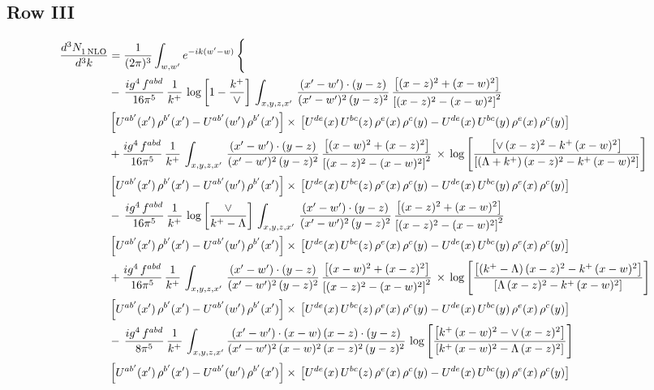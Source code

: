 \documentclass[9pt]{article}
\numberwithin{equation}{section}
\begin{document}
\subsection{Row III}
\begin{align}
   \frac{d^{3}N_{1\,\rm NLO}^{\rm}}{d^{3}k}  & = \frac{1}{(2\pi)^{3}}  \int_{w, w^\prime} e^{-ik(w^\prime-w)}\, \Bigg\{\notag \\ & -\,\frac{ig^{4}\,f^{abd}}{16\pi^{5}}\,\frac{1}{k^{+}}\, \log{\left[1-\frac{k^{+}}{\vee}\right]}\,\int_{x,y,z,x'}\, \frac{(x'-w')\cdot (y-z)}{(x'-w')^{2}\,(y-z)^{2}}\,\frac{\left[(x-z)^{2}+(x-w)^{2}\right]}{\left[(x-z)^{2}-(x-w)^{2}\right]^{2}}\notag \\ & \left[U^{ab'}(x')\,\rho^{b'}(x')-U^{ab'}(w')\, \rho^{b'}(x')\right]\times\, \left[U^{de}(x)\,U^{bc}(z)\, \rho^{e}(x)\,\rho^{c}(y)-U^{de}(x)\,U^{bc}(y)\,\rho^{e}(x)\,\rho^{c}(y)\right]\notag \\ &  +\frac{ig^{4}\,f^{abd}}{16\pi^{5}}\, \frac{1}{k^{+}}\,\int_{x,y,z,x'}\, \frac{(x'-w')\cdot (y-z)}{(x'-w')^{2}\,(y-z)^{2}}\, \frac{\left[(x-w)^{2}+(x-z)^{2}\right]}{\left[(x-z)^{2}-(x-w)^{2}\right]^{2}}\, \times\, \log{\left[\frac{\left[\vee\, (x-z)^{2} - k^{+}\, (x-w)^{2}\right]}{\left[(\Lambda + k^{+})\, (x-z)^{2} - k^{+}\, (x-w)^{2}\right]}\right]}\notag \\ & \left[U^{ab'}(x')\,\rho^{b'}(x')-U^{ab'}(w')\, \rho^{b'}(x')\right]\times\, \left[U^{de}(x)\,U^{bc}(z)\, \rho^{e}(x)\,\rho^{c}(y)-U^{de}(x)\,U^{bc}(y)\,\rho^{e}(x)\,\rho^{c}(y)\right]\notag \\ &  -\,\frac{ig^{4}\,f^{abd}}{16\pi^{5}}\,\frac{1}{k^{+}}\,\log{\left[\frac{\vee}{k^{+}-\Lambda}\right]} \,\int_{x,y,z,x'}\, \frac{(x'-w')\cdot (y-z)}{(x'-w')^{2}\,(y-z)^{2}}\,\frac{\left[(x-z)^{2}+(x-w)^{2}\right]}{\left[(x-z)^{2}-(x-w)^{2}\right]^{2}}\notag \\ & \left[U^{ab'}(x')\,\rho^{b'}(x')-U^{ab'}(w')\, \rho^{b'}(x')\right]\times\, \left[U^{de}(x)\,U^{bc}(z)\, \rho^{e}(x)\,\rho^{c}(y)-U^{de}(x)\,U^{bc}(y)\,\rho^{e}(x)\,\rho^{c}(y)\right]\notag \\ & +\frac{ig^{4}\,f^{abd}}{16\pi^{5}}\, \frac{1}{k^{+}}\,\int_{x,y,z,x'}\, \frac{(x'-w')\cdot (y-z)}{(x'-w')^{2}\,(y-z)^{2}}\, \frac{\left[(x-w)^{2}+(x-z)^{2}\right]}{\left[(x-z)^{2}-(x-w)^{2}\right]^{2}}\, \times\, \log{\left[\frac{\left[(k^{+}-\Lambda)\, (x-z)^{2} - k^{+}\, (x-w)^{2}\right]}{\left[\Lambda\, (x-z)^{2} - k^{+}\, (x-w)^{2}\right]}\right]}\notag \\ & \left[U^{ab'}(x')\,\rho^{b'}(x')-U^{ab'}(w')\, \rho^{b'}(x')\right]\times\, \left[U^{de}(x)\,U^{bc}(z)\, \rho^{e}(x)\,\rho^{c}(y)-U^{de}(x)\,U^{bc}(y)\,\rho^{e}(x)\,\rho^{c}(y)\right]\notag \\ & -\, \frac{ig^{4}\,f^{abd}}{8\pi^{5}}\,\frac{1}{k^{+}}\,\int_{x,y,z,x'}\frac{(x'-w')\cdot (x-w)\, (x-z)\cdot (y-z)}{(x'-w')^{2}\, (x-w)^{2}\, (x-z)^{2}\, (y-z)^{2}}\,\log{\left[\frac{\left[k^{+}\,(x-w)^{2}-\vee\, (x-z)^{2}\right]}{\left[k^{+}\,(x-w)^{2}-\Lambda\, (x-z)^{2}\right]}\right]} \notag \\ & \left[U^{ab'}(x')\,\rho^{b'}(x')-U^{ab'}(w')\, \rho^{b'}(x')\right]\times\, \left[U^{de}(x)\,U^{bc}(z)\, \rho^{e}(x)\,\rho^{c}(y)-U^{de}(x)\,U^{bc}(y)\,\rho^{e}(x)\,\rho^{c}(y)\right]
\end{align}
\end{document}

